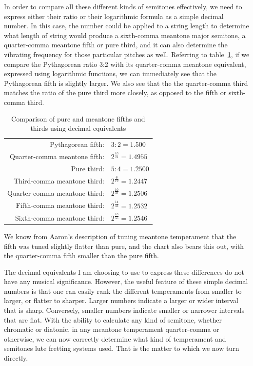 In order to compare all these different kinds of semitones effectively, we need to
express either their ratio or their logarithmic formula as a simple decimal number. In
this case, the number could be applied to a string length to determine what length of
string would produce a sixth-comma meantone major semitone, a quarter-comma meantone
fifth or pure third, and it can also determine the vibrating frequency for those
particular pitches as well. Referring to table~\ref{fifth-comparison}, if we compare
the Pythagorean ratio 3:2 with its quarter-comma meantone equivalent, expressed using
logarithmic functions, we can immediately see that the Pythagorean fifth is slightly
larger.  We also see that the the quarter-comma third matches the ratio of the
pure third more closely, as opposed to the fifth or sixth-comma third.
\begin{table}[h!]
    \begin{center}
    \begin{tabular}{ r l }
        Pythagorean fifth:            & $ 3:2 = 1.500 $ \\
        Quarter-comma meantone fifth: & $ 2^\frac{18}{31} = 1.4955 $ \\
        \hline
        Pure third:                   & $ 5:4 = 1.2500 $ \\
        Third-comma meantone third:   & $ 2^\frac{6}{19} = 1.2447 $ \\
        Quarter-comma meantone third: & $ 2^\frac{10}{31} = 1.2506 $ \\
        Fifth-comma meantone third:   & $ 2^\frac{14}{43} = 1.2532 $ \\
        Sixth-comma meantone third:   & $ 2^\frac{18}{55} = 1.2546 $ \\
    \end{tabular}
    \end{center}
    \caption{Comparison of pure and meantone fifths and thirds using decimal equivalents}
    \label{fifth-comparison}
\end{table}
We know from Aaron's description of tuning meantone temperament that the fifth was
tuned slightly flatter than pure, and the chart also bears this out, with the
quarter-comma fifth smaller than the pure fifth.

The decimal equivalents I am choosing to use to express these differences do not
have any musical significance. However, the useful feature of these simple decimal
numbers is that one can easily rank the different temperaments from smaller to larger,
or flatter to sharper. Larger numbers indicate a larger or wider interval that is
sharp.  Conversely, smaller numbers indicate smaller or narrower intervals that are
flat.  With the ability to calculate any kind of semitone, whether chromatic or
diatonic, in any meantone temperament quarter-comma or otherwise, we can now correctly
determine what kind of temperament and semitones lute fretting systems used.  That is
the matter to which we now turn directly.